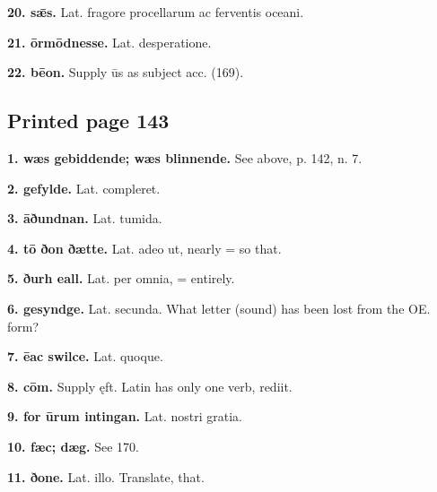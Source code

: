 \textbf{20. sǣs.} Lat. fragore procellarum ac ferventis oceani.

\textbf{21. ōrmōdnesse.} Lat. desperatione.

\textbf{22. bēon.} Supply ūs as subject acc. (169).

\subsection*{Printed page 143}

\textbf{1. wæs gebiddende; wæs blinnende.} See above, p. 142, n. 7.

\textbf{2. gefylde.} Lat. compleret.

\textbf{3. āðundnan.} Lat. tumida.

\textbf{4. tō ðon ðætte.} Lat. adeo ut, nearly = so that.

\textbf{5. ðurh eall.} Lat. per omnia, = entirely.

\textbf{6. gesyndge.} Lat. secunda. What letter (sound) has been lost from the OE. form?

\textbf{7. ēac swilce.} Lat. quoque.

\textbf{8. cōm.} Supply ęft. Latin has only one verb, rediit.

\textbf{9. for ūrum intingan.} Lat. nostri gratia.

\textbf{10. fæc; dæg.} See 170.

\textbf{11. ðone.} Lat. illo. Translate, that.


